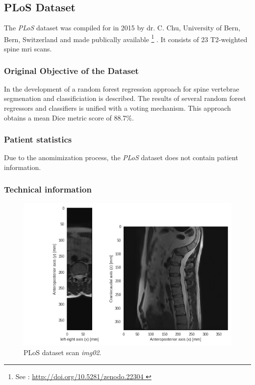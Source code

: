 \subsection{PLoS Dataset}

The \textit{PLoS} dataset was compiled for \cite{chu2015} in 2015 by dr. C. Chu, University of Bern, Bern, Switzerland and made publically available \footnote{See : \url{ http://doi.org/10.5281/zenodo.22304 }} .
It consists of 23 T2-weighted spine \acrshort{mri} scans. 

\subsubsection{Original Objective of the Dataset}

In \cite{Chu2015} the development of a random forest regression approach for spine vertebrae segmenation and classificiation is described.
The results of several random forest regressors and classifiers is unified with a voting mechanism.
This approach obtains a mean Dice metric score of 88.7\%.

\subsubsection{Patient statistics}

Due to the anomimization process, the \textit{PLoS} dataset does not contain patient information.

\subsubsection{Technical information}

\begin{figure}
    \centering
    \includegraphics[width=.95\textwidth]{automated_graphs/PLoS_img02.png}
    \caption{PLoS dataset scan \textit{img02}. \label{fig:PLoS_img02}}
\end{figure}